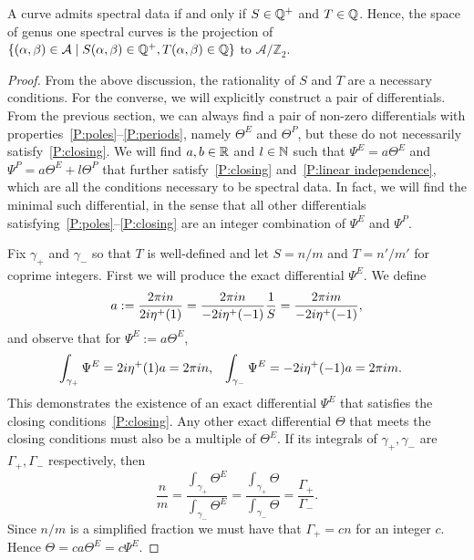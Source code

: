 \documentclass{article}
\begin{document}
\begin{lem}\label{lem:closing_conds}
A curve admits spectral data if and only if $S\in\mathbb{Q}^+$ and $T\in\mathbb{Q}$. 
Hence, the space of genus one spectral curves is the projection of $\{(\alpha,\beta) \in \mathcal{A} \mid S(\alpha,\beta) \in \mathbb{Q}^+, T(\alpha,\beta) \in \mathbb{Q}\}$ to $\mathcal{A}/\mathbb{Z}_2$. 

\begin{proof}
From the above discussion, the rationality of $S$ and $T$ are a necessary conditions.
For the converse, we will explicitly construct a pair of differentials. From the previous section, we can always find a pair of non-zero differentials with properties~\ref{P:poles}--\ref{P:periods}, namely $\Theta^E$ and $\Theta^P$, but these do not necessarily satisfy~\ref{P:closing}. We will find $a,b \in \mathbb{R}$ and $l\in \mathbb{N}$ such that $\Psi^E = a\Theta^E$ and $\Psi^P = a\Theta^E + l\Theta^P$ that further satisfy~\ref{P:closing} and~\ref{P:linear independence}, which are all the conditions necessary to be spectral data. In fact, we will find the minimal such differential, in the sense that all other differentials satisfying~\ref{P:poles}--\ref{P:closing} are an integer combination of $\Psi^E$ and $\Psi^P$.

Fix $\gamma_+$ and $\gamma_-$ so that $T$ is well-defined and let $S = n/m$ and $T = n'/m'$ for coprime integers.
First we will produce the exact differential $\Psi^E$. 
We define
\[
a := \frac{2\pi i n}{2i \eta^+(1)} = \frac{2\pi i n}{-2i \eta^+(-1)}\frac{1}{S} = \frac{2\pi i m}{-2i \eta^+(-1)},
\]
and observe that for $\Psi^E := a\Theta^E$,
\begin{align*}
\int_{\gamma_{+}} \Psi^E &= 2i \eta^+(1)a = 2\pi i n, 
&
\int_{\gamma_{-}} \Psi^E &= -2i \eta^+(-1)a = 2\pi i m.
\end{align*}
This demonstrates the existence of an exact differential $\Psi^E$ that satisfies the closing conditions~\ref{P:closing}. 
Any other exact differential $\Theta$ that meets the closing conditions must also be a multiple of $\Theta^E$. If its integrals of $\gamma_+,\gamma_-$ are $\Gamma_+,\Gamma_-$ respectively, then 
\[
\frac{n}{m} 
= \frac{\int_{\gamma_+} \Theta^E}{\int_{\gamma_-} \Theta^E} 
= \frac{\int_{\gamma_+} \Theta}{\int_{\gamma_-} \Theta} 
= \frac{\Gamma_+}{\Gamma_-}.
\]
Since $n/m$ is a simplified fraction we must have that $\Gamma_+ = cn$ for an integer $c$. Hence $\Theta = ca\Theta^E = c \Psi^E$.



\end{proof}
\end{lem}
\end{document}
